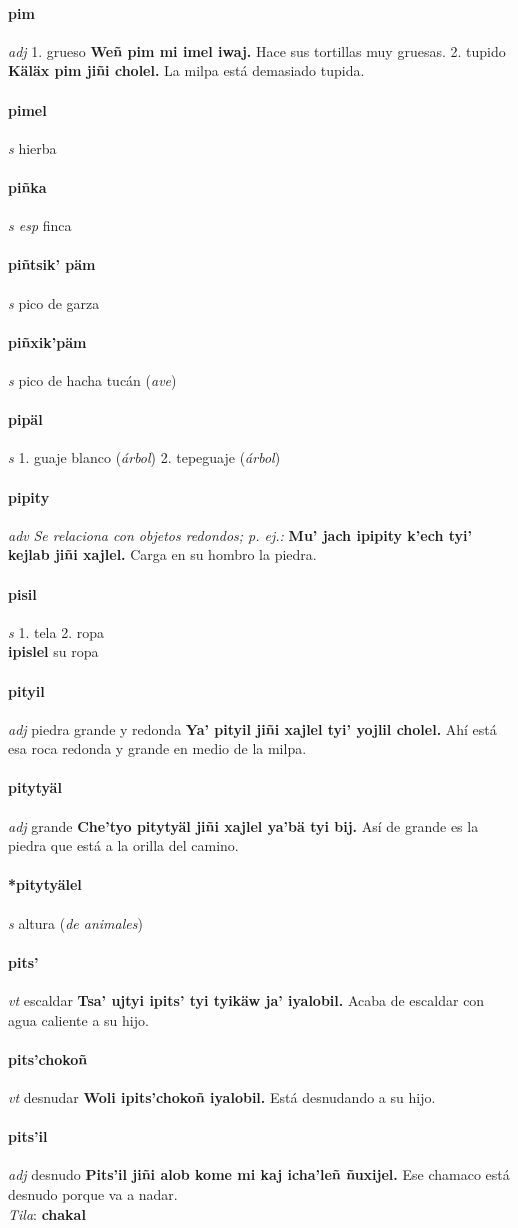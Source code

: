 \documentclass{scrbook}
\newcommand{\entry}[1]{\paragraph{#1}}
\newcommand{\onedefinition}[1]{#1.}
\newcommand{\nontranslationdef}[1]{\textit{#1}}
\newcommand{\partofspeech}[1]{\textit{#1}}
\newcommand{\spanishtranslation}[1]{#1}
\newcommand{\clarification}[1]{(\textit{#1})}
\newcommand{\cholexample}[1]{\textbf{#1}}
\newcommand{\exampletranslation}[1]{#1}
\newcommand{\dialectvariant}[1]{\\\textit{#1}:}
\newcommand{\dialectword}[1]{\textbf{#1}}
\newcommand{\secondaryentry}[1]{\\\textbf{#1}}
\newcommand{\secondtranslation}[1]{#1}
\begin{document}
\begin{multicols}{2}
\entry{pim}
\partofspeech{adj}
\onedefinition{1}
\spanishtranslation{grueso}
\cholexample{Weñ pim mi imel iwaj.}
\exampletranslation{Hace sus tortillas muy gruesas.}
\onedefinition{2}
\spanishtranslation{tupido}
\cholexample{Käläx pim jiñi cholel.}
\exampletranslation{La milpa está demasiado tupida.}

\entry{pimel}
\partofspeech{s}
\spanishtranslation{hierba}

\entry{piñka}
\partofspeech{s esp}
\spanishtranslation{finca}

\entry{piñtsik' päm}
\partofspeech{s}
\spanishtranslation{pico de garza}

\entry{piñxik'päm}
\partofspeech{s}
\spanishtranslation{pico de hacha}
\spanishtranslation{tucán}
\clarification{ave}

\entry{pipäl}
\partofspeech{s}
\onedefinition{1}
\spanishtranslation{guaje blanco}
\clarification{árbol}
\onedefinition{2}
\spanishtranslation{tepeguaje}
\clarification{árbol}

\entry{pipity}
\partofspeech{adv}
\nontranslationdef{Se relaciona con objetos redondos; p. ej.:}
\cholexample{Mu' jach ipipity k'ech tyi' kejlab jiñi xajlel.}
\exampletranslation{Carga en su hombro la piedra.}

\entry{pisil}
\partofspeech{s}
\onedefinition{1}
\spanishtranslation{tela}
\onedefinition{2}
\spanishtranslation{ropa}
\secondaryentry{ipislel}
\secondtranslation{su ropa}

\entry{pityil}
\partofspeech{adj}
\spanishtranslation{piedra grande y redonda}
\cholexample{Ya' pityil jiñi xajlel tyi' yojlil cholel.}
\exampletranslation{Ahí está esa roca redonda y grande en medio de la milpa.}

\entry{pitytyäl}
\partofspeech{adj}
\spanishtranslation{grande}
\cholexample{Che'tyo pitytyäl jiñi xajlel ya'bä tyi bij.}
\exampletranslation{Así de grande es la piedra que está a la orilla del camino.}

\entry{*pitytyälel}
\partofspeech{s}
\spanishtranslation{altura}
\clarification{de animales}

\entry{pits'}
\partofspeech{vt}
\spanishtranslation{escaldar}
\cholexample{Tsa' ujtyi ipits' tyi tyikäw ja' iyalobil.}
\exampletranslation{Acaba de escaldar con agua caliente a su hijo.}

\entry{pits'chokoñ}
\partofspeech{vt}
\spanishtranslation{desnudar}
\cholexample{Woli ipits'chokoñ iyalobil.}
\exampletranslation{Está desnudando a su hijo.}

\entry{pits'il}
\partofspeech{adj}
\spanishtranslation{desnudo}
\cholexample{Pits'il jiñi alob kome mi kaj icha'leñ ñuxijel.}
\exampletranslation{Ese chamaco está desnudo porque va a nadar.}
\dialectvariant{Tila}
\dialectword{chakal}


\end{multicols}
\end{document}
